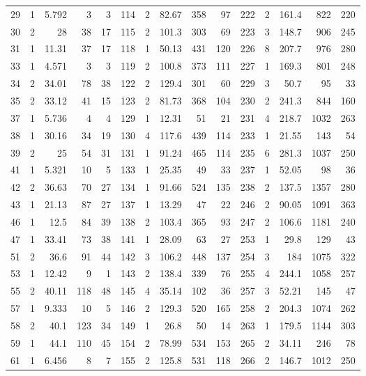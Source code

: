 \begin{small}
\begin{longtable}{rrrrr|rrrrr|rrrrr}
29 & 1 & 5.792 & 3 & 3 & 114 & 2 & 82.67 & 358 & 97 & 222 & 2 & 161.4 & 822 & 220\\
30 & 2 & 28 & 38 & 17 & 115 & 2 & 101.3 & 303 & 69 & 223 & 3 & 148.7 & 906 & 245\\
31 & 1 & 11.31 & 37 & 17 & 118 & 1 & 50.13 & 431 & 120 & 226 & 8 & 207.7 & 976 & 280\\
33 & 1 & 4.571 & 3 & 3 & 119 & 2 & 100.8 & 373 & 111 & 227 & 1 & 169.3 & 801 & 248\\
34 & 2 & 34.01 & 78 & 38 & 122 & 2 & 129.4 & 301 & 60 & 229 & 3 & 50.7 & 95 & 33\\
35 & 2 & 33.12 & 41 & 15 & 123 & 2 & 81.73 & 368 & 104 & 230 & 2 & 241.3 & 844 & 160\\
37 & 1 & 5.736 & 4 & 4 & 129 & 1 & 12.31 & 51 & 21 & 231 & 4 & 218.7 & 1032 & 263\\
38 & 1 & 30.16 & 34 & 19 & 130 & 4 & 117.6 & 439 & 114 & 233 & 1 & 21.55 & 143 & 54\\
39 & 2 & 25 & 54 & 31 & 131 & 1 & 91.24 & 465 & 114 & 235 & 6 & 281.3 & 1037 & 250\\
41 & 1 & 5.321 & 10 & 5 & 133 & 1 & 25.35 & 49 & 33 & 237 & 1 & 52.05 & 98 & 36\\
42 & 2 & 36.63 & 70 & 27 & 134 & 1 & 91.66 & 524 & 135 & 238 & 2 & 137.5 & 1357 & 280\\
43 & 1 & 21.13 & 87 & 27 & 137 & 1 & 13.29 & 47 & 22 & 246 & 2 & 90.05 & 1091 & 363\\
46 & 1 & 12.5 & 84 & 39 & 138 & 2 & 103.4 & 365 & 93 & 247 & 2 & 106.6 & 1181 & 240\\
47 & 1 & 33.41 & 73 & 38 & 141 & 1 & 28.09 & 63 & 27 & 253 & 1 & 29.8 & 129 & 43\\
51 & 2 & 36.6 & 91 & 44 & 142 & 3 & 106.2 & 448 & 137 & 254 & 3 & 184 & 1075 & 322\\
53 & 1 & 12.42 & 9 & 1 & 143 & 2 & 138.4 & 339 & 76 & 255 & 4 & 244.1 & 1058 & 257\\
55 & 2 & 40.11 & 118 & 48 & 145 & 4 & 35.14 & 102 & 36 & 257 & 3 & 52.21 & 145 & 47\\
57 & 1 & 9.333 & 10 & 5 & 146 & 2 & 129.3 & 520 & 165 & 258 & 2 & 204.3 & 1074 & 262\\
58 & 2 & 40.1 & 123 & 34 & 149 & 1 & 26.8 & 50 & 14 & 263 & 1 & 179.5 & 1144 & 303\\
59 & 1 & 44.1 & 110 & 45 & 154 & 2 & 78.99 & 534 & 153 & 265 & 2 & 34.11 & 246 & 78\\
61 & 1 & 6.456 & 8 & 7 & 155 & 2 & 125.8 & 531 & 118 & 266 & 2 & 146.7 & 1012 & 250\\

\end{longtable}
\end{small}
